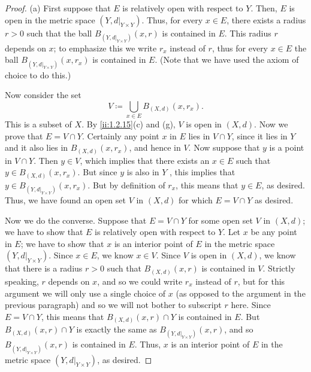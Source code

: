 \begin{proof}{(a)}
  First suppose that \(E\) is relatively open with respect to \(Y\).
  Then, \(E\) is open in the metric space \((Y, d|_{Y \times Y})\).
  Thus, for every \(x \in E\), there exists a radius \(r > 0\) such that the ball \(B_{(Y, d|_{Y \times Y})}(x, r)\) is contained in \(E\).
  This radius \(r\) depends on \(x\);
  to emphasize this we write \(r_x\) instead of \(r\), thus for every \(x \in E\) the ball \(B_{(Y, d|_{Y \times Y})}(x, r_x)\) is contained in \(E\).
  (Note that we have used the axiom of choice to do this.)

  Now consider the set
  \[
    V \coloneqq \bigcup_{x \in E} B_{(X, d)}(x, r_x).
  \]
  This is a subset of \(X\).
  By \cref{ii:1.2.15}(c) and (g), \(V\) is open in \((X, d)\).
  Now we prove that \(E = V \cap Y\).
  Certainly any point \(x\) in \(E\) lies in \(V \cap Y\), since it lies in \(Y\) and it also lies in \(B_{(X, d)}(x, r_x)\), and hence in \(V\).
  Now suppose that \(y\) is a point in \(V \cap Y\).
  Then \(y \in V\), which implies that there exists an \(x \in E\) such that \(y \in B_{(X, d)}(x, r_x)\).
  But since \(y\) is also in \(Y\) , this implies that \(y \in B_{(Y, d|_{Y \times Y})}(x, r_x)\).
  But by definition of \(r_x\), this means that \(y \in E\), as desired.
  Thus, we have found an open set \(V\) in \((X, d)\) for which \(E = V \cap Y\) as desired.

  Now we do the converse.
  Suppose that \(E = V \cap Y\) for some open set \(V\) in \((X, d)\);
  we have to show that \(E\) is relatively open with respect to \(Y\).
  Let \(x\) be any point in \(E\);
  we have to show that \(x\) is an interior point of \(E\) in the metric space \((Y, d|_{Y \times Y})\).
  Since \(x \in E\), we know \(x \in V\).
  Since \(V\) is open in \((X, d)\), we know that there is a radius \(r > 0\) such that \(B_{(X, d)}(x, r)\) is contained in \(V\).
  Strictly speaking, \(r\) depends on \(x\), and so we could write \(r_x\) instead of \(r\), but for this argument we will only use a single choice of \(x\) (as opposed to the argument in the previous paragraph) and so we will not bother to subscript \(r\) here.
  Since \(E = V \cap Y\), this means that \(B_{(X, d)}(x, r) \cap Y\) is contained in \(E\).
  But \(B_{(X, d)}(x, r) \cap Y\) is exactly the same as \(B_{(Y, d|_{Y \times Y})}(x, r)\), and so \(B_{(Y, d|_{Y \times Y})}(x, r)\) is contained in \(E\).
  Thus, \(x\) is an interior point of \(E\) in the metric space \((Y, d|_{Y \times Y})\), as desired.
\end{proof}

